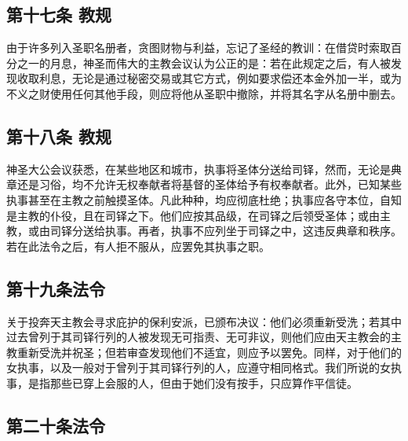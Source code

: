 
\subsection{第十七条 教规}

由于许多列入圣职名册者，贪图财物与利益，忘记了圣经的教训：在借贷时索取百分之一的月息，神圣而伟大的主教会议认为公正的是：若在此规定之后，有人被发现收取利息，无论是通过秘密交易或其它方式，例如要求偿还本金外加一半，或为不义之财使用任何其他手段，则应将他从圣职中撤除，并将其名字从名册中删去。\par


\subsection{第十八条 教规}

神圣大公会议获悉，在某些地区和城市，执事将圣体分送给司铎，然而，无论是典章还是习俗，均不允许无权奉献者将基督的圣体给予有权奉献者。此外，已知某些执事甚至在主教之前触摸圣体。凡此种种，均应彻底杜绝；执事应各守本位，自知是主教的仆役，且在司铎之下。他们应按其品级，在司铎之后领受圣体；或由主教，或由司铎分送给执事。再者，执事不应列坐于司铎之中，这违反典章和秩序。若在此法令之后，有人拒不服从，应罢免其执事之职。\par


\subsection{第十九条法令}

关于投奔天主教会寻求庇护的保利安派，已颁布决议：他们必须重新受洗；若其中过去曾列于其司铎行列的人被发现无可指责、无可非议，则他们应由天主教会的主教重新受洗并祝圣；但若审查发现他们不适宜，则应予以罢免。同样，对于他们的女执事，以及一般对于曾列于其司铎行列的人，应遵守相同格式。我们所说的女执事，是指那些已穿上会服的人，但由于她们没有按手，只应算作平信徒。\par


\subsection{第二十条法令}

